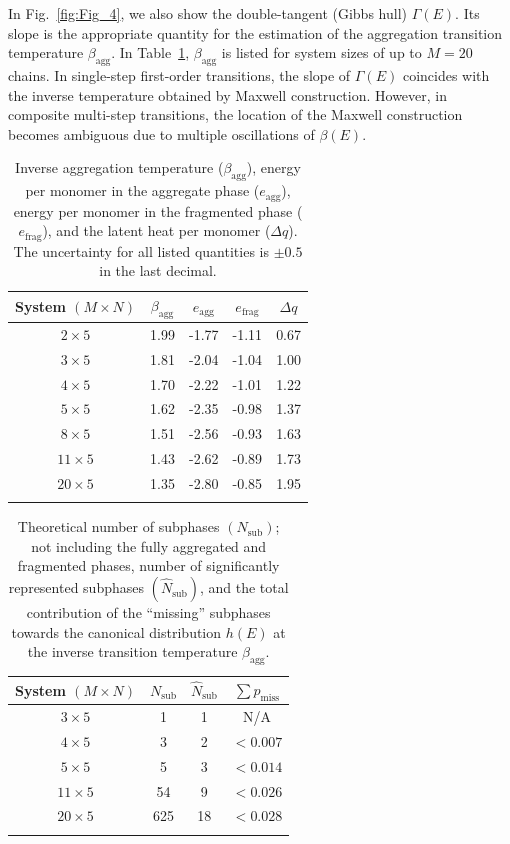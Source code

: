 \documentclass[12pt]{report}
\begin{document}
In Fig.~\ref{fig:Fig_4}, we also show the double-tangent (Gibbs hull)
$\Gamma(E)$. Its slope is the appropriate quantity for 
the estimation of the aggregation transition temperature 
$\beta_{\mathrm{agg}}$. In Table~\ref{tab:Tab_1}, $\beta_{\mathrm{agg}}$
is listed for
system sizes of up to $M = 20$ chains. In single-step first-order
transitions, 
the slope of $\Gamma(E)$ coincides with the inverse temperature obtained
by Maxwell construction. However, in composite multi-step 
transitions, the location of the Maxwell construction becomes
ambiguous due to multiple oscillations of $\beta(E)$. 
%
\begin{table}
\caption{\label{tab:Tab_1}%
Inverse aggregation temperature ($\beta_{\mathrm{agg}}$), energy per
monomer in the aggregate phase ($e_{\mathrm{agg}}$), energy per monomer in
the fragmented phase ($e_{\mathrm{frag}}$), and the latent heat per monomer
($\Delta q$). The uncertainty for all listed quantities is $\pm 0.5$ in
the last decimal.}
\begin{tabular*}{\hsize}{@{\extracolsep{\fill}}ccccc@{}}
\hline
\hline
System $(M \times N)$& $\beta_{\mathrm{agg}}$ & $e_{\mathrm{agg}}$ &
$e_{\mathrm{frag}}$ & $\Delta q$\\
\hline
$2  \times 5$  &   1.99 &  -1.77 & -1.11 & 0.67\\
$3  \times 5$  &   1.81 &  -2.04 & -1.04 & 1.00\\
$4  \times 5$  &   1.70 &  -2.22 & -1.01 & 1.22\\
$5  \times 5$  &   1.62 &  -2.35 & -0.98 & 1.37\\
$8  \times 5$   &  1.51 &  -2.56 & -0.93 & 1.63\\
$11 \times 5$  &  1.43 &  -2.62 & -0.89 & 1.73\\
$20 \times 5$  &  1.35 &  -2.80 & -0.85 & 1.95\\
\\
\hline
\hline
\end{tabular*}
\end{table}
%
\begin{table}
\caption{\label{tab:Tab_2}%
Theoretical number of subphases $(N_{\mathrm{sub}})$; not including the
fully aggregated and fragmented phases, number of significantly
represented subphases $(\hat{N}_{\mathrm{sub}})$, and the total contribution
of the ``missing'' subphases towards the canonical distribution $h(E)$ at the
inverse transition temperature $\beta_{\mathrm{agg}}$.}
\begin{tabular*}{\hsize}{@{\extracolsep{\fill}}cccc@{}}
\hline
\hline
System $(M \times N)$ & $N_{\mathrm{sub}}$ &$\hat{N}_{\mathrm{sub}}$ & $\sum p_{\mathrm{miss}}$\\
\hline
$3  \times 5$	&	1 	&	1  	& N/A\\
$4  \times 5$	&	3 	&	2  	&  $< 0.007$\\
$5  \times 5$	&	5 	&	3  	&  $< 0.014$\\
$11 \times 5$	&	54 	&	9  	&  $< 0.026$\\
$20 \times 5$	&	625 	& 	18	&  $< 0.028$\\
\\
\hline
\hline
\end{tabular*}
\end{table}
%
\end{document}
